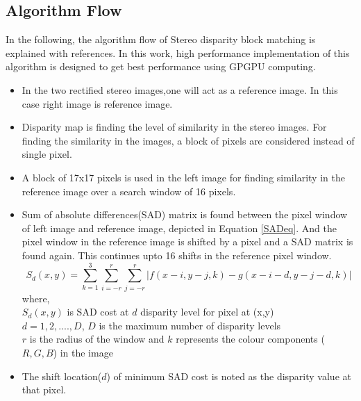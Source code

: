 \subsection{Algorithm Flow}
In the following, the algorithm flow of Stereo disparity block matching is explained with references. In this work, high performance implementation of this algorithm is designed to get best performance using GPGPU computing.
\begin{itemize}
	\item In the two rectified stereo images,one will act as a reference image. In this case right image is reference image.
	\item Disparity map is finding the level of similarity in the stereo images. For finding the similarity in the images, a block of pixels are considered instead of single pixel.
	\item A block of 17x17 pixels is used in the left image for finding similarity in the reference image over a search window of 16 pixels.
	\item Sum of absolute differences(SAD) matrix is found between the pixel window of left image and reference image, depicted in Equation \ref{SADeq}. And the pixel window in the reference image is shifted by a pixel and a SAD matrix is found again. This continues upto 16 shifts in the reference pixel window.
	\begin{equation}\label{SADeq}
	S_d(x,y) = \sum_{k=1}^{3}\sum_{i=-r}^{r} \sum_{j=-r}^{r} |f(x-i,y-j,k)-g(x-i-d,y-j-d,k)|
	\end{equation}
	where,\\
	$S_d(x,y)$ is SAD cost at $d$ disparity level for pixel at (x,y)\\
	$d={1,2,....,D}$, $D$ is the maximum number of disparity levels \\
	$r$ is the radius of the window
	and $k$ represents the colour components ($R,G,B$) in the image
	
	\item The shift location($d$) of minimum SAD cost is noted as the disparity value at that pixel.
\end{itemize}
